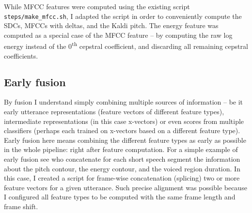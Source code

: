 \documentclass[bsc,frontabs,twoside,singlespacing,parskip,deptreport]{infthesis}
\begin{document}
{{{      While MFCC features were computed using the existing script \verb|steps/make_mfcc.sh|, I adapted the script in order to conveniently compute the SDCs, MFCCs with deltas, and the Kaldi pitch. The energy feature was computed as a special case of the MFCC feature -- by computing the raw log energy instead of the 0\textsuperscript{th} cepstral coefficient, and discarding all remaining cepstral coefficients.
    }

    \subsection{Early fusion}{
      \label{sec:early-fusion}
      By fusion I understand simply combining multiple sources of information -- be it early utterance representations (feature vectors of different feature types), intermediate representations (in this case x-vectors) or even scores from multiple classifiers (perhaps each trained on x-vectors based on a different feature type).
      Early fusion here means combining the different feature types as early as possible in the whole pipeline: right after feature computation. For a simple example of early fusion see \citet{Martinez_et_al_2012} who concatenate for each short speech segment the information about the pitch contour, the energy contour, and the voiced region duration. In this case, I created a script for frame-wise concatenation (splicing) two or more feature vectors for a given utterance. Such precise alignment was possible because I configured all feature types to be computed with the same frame length and frame shift.
    }

}}
\end{document}
